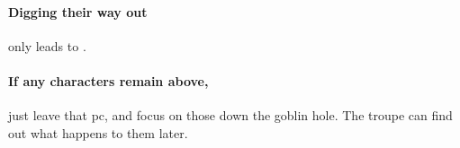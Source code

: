\begin{multicols}{2}
\paragraph{Digging their way out}
only leads to .

\paragraph{If any characters remain above,}
just leave that \gls{pc}, and focus on those down the goblin hole.
The troupe can find out what happens to them later.

\end{multicols}
